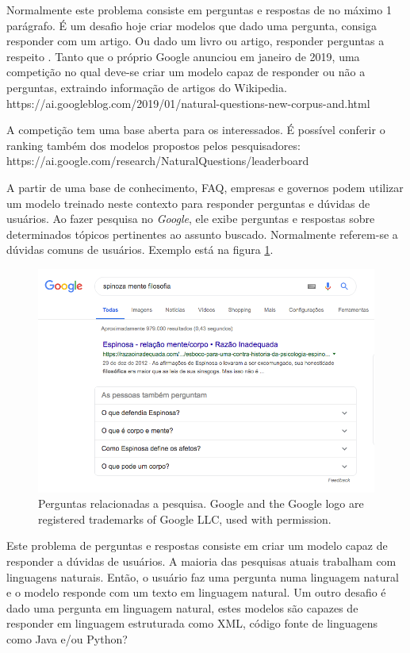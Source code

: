 Normalmente este problema consiste em perguntas e respostas de no máximo 1 parágrafo. É um desafio hoje criar modelos que dado uma pergunta, consiga responder com um artigo. Ou dado um livro ou artigo, responder perguntas a respeito . Tanto que o próprio Google anunciou em janeiro de 2019, uma competição no qual deve-se criar um modelo capaz de responder ou não a perguntas, extraindo informação de artigos do Wikipedia. https://ai.googleblog.com/2019/01/natural-questions-new-corpus-and.html

A competição tem uma base aberta para os interessados. É possível conferir o ranking também dos modelos propostos pelos pesquisadores: https://ai.google.com/research/NaturalQuestions/leaderboard


A partir de uma base de conhecimento, FAQ, empresas e governos podem utilizar um modelo treinado neste contexto para responder perguntas e dúvidas de usuários. Ao fazer pesquisa no \textit{Google}, ele exibe perguntas e respostas sobre determinados tópicos pertinentes ao assunto buscado. Normalmente referem-se a dúvidas comuns de usuários. Exemplo está na figura \ref{fig:busca-google}.

\begin{figure}[h]
\includegraphics[width=12cm]{src/figuras/cap-introducao/busca-google-pergunta-resposta.png}
\caption{Perguntas relacionadas a pesquisa. Google and the Google logo are registered trademarks of Google LLC, used with permission.}
\label{fig:busca-google}
\end{figure}

Este problema de perguntas e respostas consiste em criar um modelo capaz de responder a dúvidas de usuários. A maioria das pesquisas atuais trabalham com linguagens naturais. Então, o usuário faz uma pergunta numa linguagem natural e o modelo responde com um texto em linguagem natural. Um outro desafio é dado uma pergunta em linguagem natural, estes modelos são capazes de responder em linguagem estruturada como XML, código fonte de linguagens como Java e/ou Python? 

